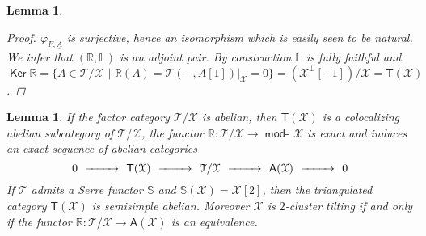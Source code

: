 \documentclass[oneside, a4paper,reqno]{amsart}
\numberwithin{equation}{section}
\newtheorem{lem}[thm]{Lemma}
\theoremstyle{definition}
\begin{document}
\begin{lem}
\begin{proof}
$\varphi_{F,{\underline A}}$ is surjective, hence an isomorphism which is easily seen to be natural.
 We infer that $(\mathbb R,\mathbb L)$ is an adjoint pair.   By construction $\mathbb L$ is fully faithful and  $\operatorname*{\mathsf{Ker}}\mathbb R = \big\{{\underline A} \in {\mathcal T}/{\mathcal X} \,\, | \,\, \mathbb R({\underline A}) = {\mathcal T}(-,A[1])|_{\mathcal X} = 0\big\} = ({\mathcal X}^{\bot}[-1])/{\mathcal X} = \mathsf{T}({\mathcal X})$. 
\end{proof} 
\end{lem}

\begin{lem} If the factor category ${\mathcal T}/{\mathcal X}$ is abelian, then  $\mathsf{T}({\mathcal X})$ is a colocalizing abelian subcategory of ${\mathcal T}/{\mathcal X}$,  the functor $\mathbb R \colon {\mathcal T}/{\mathcal X} {\longrightarrow} \operatorname*{\mathsf{mod}-\!}{\mathcal X}$ is exact and induces an exact sequence of abelian categories
\begin{equation}
\begin{CD}
0 \, @> >> \,  \mathsf{T}({\mathcal X}) \, @> >> \,  {\mathcal T}/{\mathcal X} \, @> >> \,  \mathsf{A}({\mathcal X}) \, @> >> \,  0
\end{CD}
\end{equation}
If ${\mathcal T}$ admits a Serre functor $\mathbb S$ and $\mathbb S({\mathcal X}) = {\mathcal X}[2]$, then the triangulated category $\mathsf{T}({\mathcal X})$ is semisimple abelian. Moreover  ${\mathcal X}$ is $2$-cluster tilting if and only if the functor $\mathbb R \colon {\mathcal T}/{\mathcal X} {\longrightarrow} \mathsf{A}({\mathcal X})$ is an equivalence. 

\end{lem}
\end{document}
